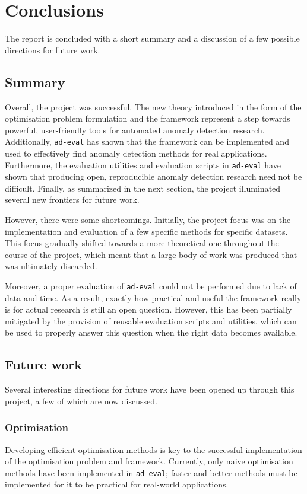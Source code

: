 \chapter{Conclusions}
\label{ch:conclusions}

The report is concluded with a short summary and a discussion of a few possible directions for future work.

\section{Summary}

Overall, the project was successful. The new theory introduced in the form of the optimisation problem formulation and the framework represent a step towards powerful, user-friendly tools for automated anomaly detection research. Additionally, \texttt{ad-eval} has shown that the framework can be implemented and used to effectively find anomaly detection methods for real applications. Furthermore, the evaluation utilities and evaluation scripts in \texttt{ad-eval} have shown that producing open, reproducible anomaly detection research need not be difficult. Finally, as summarized in the next section, the project illuminated several new frontiers for future work.

However, there were some shortcomings. Initially, the project focus was on the implementation and evaluation of a few specific methods for specific datasets. This focus gradually shifted towards a more theoretical one throughout the course of the project, which meant that a large body of work was produced that was ultimately discarded.

Moreover, a proper evaluation of \texttt{ad-eval} could not be performed due to lack of data and time. As a result, exactly how practical and useful the framework really is for actual research is still an open question. However, this has been partially mitigated by the provision of reusable evaluation scripts and utilities, which can be used to properly answer this question when the right data becomes available.

\section{Future work}
Several interesting directions for future work have been opened up through this project, a few of which are now discussed.

\subsection{Optimisation}
Developing efficient optimisation methods is key to the successful implementation of the optimisation problem and framework. Currently, only naive optimisation methods have been implemented in \texttt{ad-eval}; faster and better methods must be implemented for it to be practical for real-world applications.


